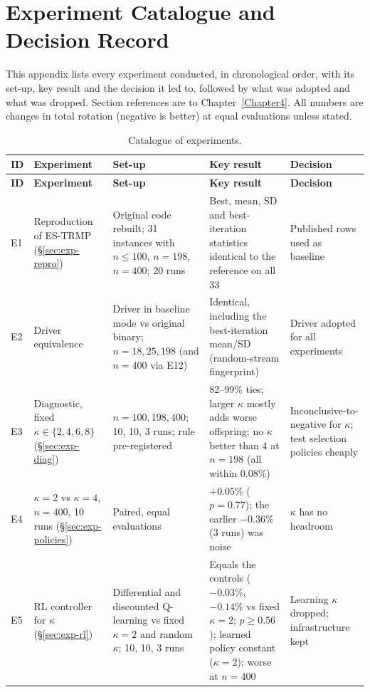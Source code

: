 
\chapter{Experiment Catalogue and Decision Record}\label{AppendixA}

This appendix lists every experiment conducted, in chronological order, with its set-up, key result and the decision it led to, followed by what was adopted and what was dropped. Section references are to Chapter~\ref{Chapter4}. All numbers are changes in total rotation (negative is better) at equal evaluations unless stated.

{\footnotesize
\setlength{\tabcolsep}{3pt}
\begin{longtable}{P{0.7cm}P{3.0cm}P{3.5cm}P{4.2cm}P{2.9cm}}
\caption{Catalogue of experiments.}\label{tab:catalogue}\\
\toprule \textbf{ID} & \textbf{Experiment} & \textbf{Set-up} & \textbf{Key result} & \textbf{Decision}\\ \midrule \endfirsthead
\toprule \textbf{ID} & \textbf{Experiment} & \textbf{Set-up} & \textbf{Key result} & \textbf{Decision}\\ \midrule \endhead
\bottomrule \endfoot
E1 & Reproduction of ES-TRMP (\S\ref{sec:exp-repro}) & Original code rebuilt; 31 instances with $n\le100$, $n=198$, $n=400$; 20 runs & Best, mean, SD and best-iteration statistics identical to the reference on all 33 & Published rows used as baseline\\
E2 & Driver equivalence & Driver in baseline mode vs original binary; $n=18,25,198$ (and $n=400$ via E12) & Identical, including the best-iteration mean/SD (random-stream fingerprint) & Driver adopted for all experiments\\
E3 & Diagnostic, fixed $\kappa\in\{2,4,6,8\}$ (\S\ref{sec:exp-diag}) & $n=100,198,400$; 10, 10, 3 runs; rule pre-registered & 82--99\% ties; larger $\kappa$ mostly adds worse offspring; no $\kappa$ better than 4 at $n=198$ (all within 0.08\%) & Inconclusive-to-negative for $\kappa$; test selection policies cheaply\\
E4 & $\kappa=2$ vs $\kappa=4$, $n=400$, 10 runs (\S\ref{sec:exp-policies}) & Paired, equal evaluations & $+0.05\%$ ($p=0.77$); the earlier $-0.36\%$ (3 runs) was noise & $\kappa$ has no headroom\\
E5 & RL controller for $\kappa$ (\S\ref{sec:exp-rl}) & Differential and discounted Q-learning vs fixed $\kappa=2$ and random $\kappa$; 10, 10, 3 runs & Equals the controls ($-0.03\%$, $-0.14\%$ vs fixed $\kappa=2$; $p\ge0.56$); learned policy constant ($\kappa=2$); worse at $n=400$ & Learning $\kappa$ dropped; infrastructure kept\\

\end{longtable}}
